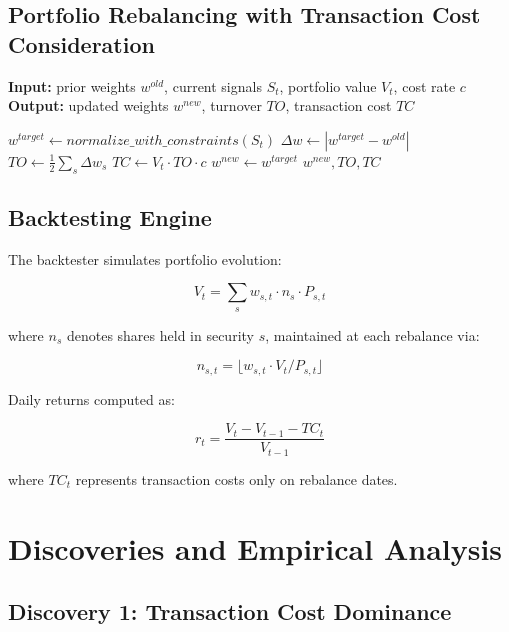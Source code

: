 \documentclass[twocolumn,ieee]{Base_Latex_Template/arithmaxresearch}
\begin{document}
\subsection{Portfolio Rebalancing with Transaction Cost Consideration}
\begin{algorithm}[H]
\caption{Monthly Portfolio Rebalancing With Cost Tracking}
\label{alg:rebalance}
\begin{algorithmic}[1]
\State \textbf{Input:} prior weights $w^{old}$, current signals $S_t$, portfolio value $V_t$, cost rate $c$
\State \textbf{Output:} updated weights $w^{new}$, turnover $TO$, transaction cost $TC$

\State $w^{target} \gets normalize\_with\_constraints(S_t)$
\State $\Delta w \gets |w^{target} - w^{old}|$
\State $TO \gets \frac{1}{2}\sum_s \Delta w_s$
\State $TC \gets V_t \cdot TO \cdot c$
\State $w^{new} \gets w^{target}$
\State \Return $w^{new}, TO, TC$
\end{algorithmic}
\end{algorithm}

\subsection{Backtesting Engine}

The backtester simulates portfolio evolution:

$$V_t = \sum_s w_{s,t} \cdot n_s \cdot P_{s,t}$$

where $n_s$ denotes shares held in security $s$, maintained at each rebalance via:

$$n_{s,t} = \lfloor w_{s,t} \cdot V_t / P_{s,t} \rfloor$$

Daily returns computed as:

$$r_t = \frac{V_t - V_{t-1} - TC_t}{V_{t-1}}$$

where $TC_t$ represents transaction costs only on rebalance dates.

\section{Discoveries and Empirical Analysis}

\subsection{Discovery 1: Transaction Cost Dominance}
\end{document}
